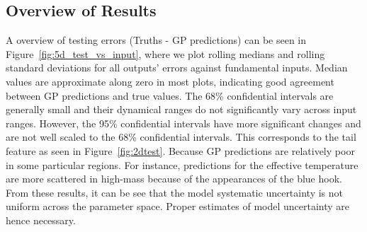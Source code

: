 \subsection{Overview of Results}

A overview of testing errors (Truths - GP predictions) can be seen in Figure~\ref{fig:5d_test_vs_input}, where we plot rolling medians and rolling standard deviations for all outputs' errors against fundamental inputs.
%
Median values are approximate along zero in most plots, indicating good agreement between GP predictions and true values. The 68\% confidential intervals are generally small and their dynamical ranges do not significantly vary across input ranges. 
%
However, the 95\% confidential intervals have more significant changes and are not well scaled to the 68\% confidential intervals. This corresponds to the tail feature as seen in Figure~\ref{fig:2dtest}. Because GP predictions are relatively poor in some particular regions. For instance, predictions for the effective temperature are more scattered in high-mass because of the appearances of the blue hook. 
%
From these results, it can be see that the model systematic uncertainty is not uniform across the parameter space. Proper estimates of model uncertainty are hence necessary. 


